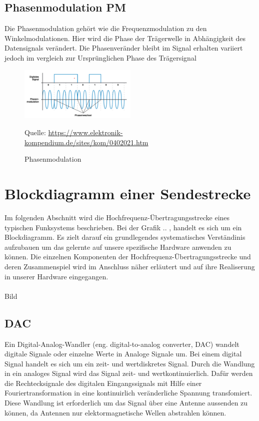 \subsection{Phasenmodulation PM}
Die Phasenmodulation gehört wie die Frequenzmodulation zu den Winkelmodulationen.
Hier wird die Phase der Trägerwelle in Abhängigkeit des Datensignals verändert.
Die Phasenveränder bleibt im Signal erhalten variiert jedoch im vergleich
zur Ursprünglichen Phase des Trägersignal
\begin{figure}[h]
    \centering
    \includegraphics[width=0.5\textwidth]{Pictures/04020211.png}
    \caption{Phasenmodulation}
    \footnotesize{Quelle: \url{https://www.elektronik-kompendium.de/sites/kom/0402021.htm}}
\end{figure}

\section{Blockdiagramm einer Sendestrecke}
Im folgenden Abschnitt wird die Hochfrequenz-Übertragungsstrecke eines typischen Funksystems beschrieben. Bei der Grafik .. , handelt es sich um ein Blockdiagramm. Es zielt darauf ein grundlegendes
systematisches Verständinis aufzubauen um das gelernte auf unsere spezifische Hardware anwenden zu können. Die einzelnen Komponenten der Hochfrequenz-Übertragungsstrecke 
und deren Zusammenspiel wird im Anschluss näher erläutert und auf ihre Realiserung in unserer Hardware eingegangen.\\
\\Bild\\

\subsection{DAC}
Ein Digital-Analog-Wandler (eng. digital-to-analog converter, DAC) wandelt digitale Signale oder einzelne Werte in Analoge
Signale um. Bei einem digital Signal handelt es sich um ein zeit- und wertdiskretes Signal. Durch die Wandlung
in ein analoges Signal wird das Signal zeit- und wertkontinuierlich.  Dafür werden die Rechtecksignale des digitalen Eingangssignals mit Hilfe einer Fouriertransformation
in eine  kontinuirlich veränderliche Spannung transfomiert. Diese Wandlung ist erforderlich um das Signal über eine
Antenne aussenden zu können, da Antennen nur elektormagnetische Wellen abstrahlen können. \\

